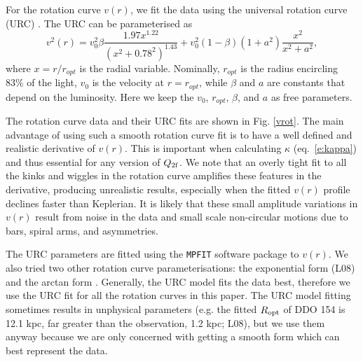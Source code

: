 \documentclass[12pt,preprint]{aastex}
\begin{document}
For the rotation curve $v(r)$, we fit the data using the universal rotation curve (URC) \citep{bat00,per96}. The URC can be parameterised as 
\begin{equation}
v^2(r)=v_0^2\beta \frac{1.97x^{1.22}}{(x^2+0.78^2)^{1.43}}+v_0^2(1-\beta)(1+a^2)\frac{x^2}{x^2+a^2},
\end{equation}
where $x=r/r_{opt}$ is the radial variable. Nominally, $r_{opt}$ is the radius encircling $83\%$ of the light, $v_0$ is the velocity at $r=r_{opt}$, while $\beta$ and $a$ are constants that depend on the luminosity. Here we keep the $v_0$, $r_{opt}$,  $\beta$, and $a$ as free parameters.

The rotation curve data and their URC fits are shown in Fig. \ref{vrot}. The main advantage of using such a smooth rotation curve fit is to have a well defined and realistic derivative of $v(r)$. This is important when calculating $\kappa$ (eq.~\ref{e:kappa}) and thus essential for any version of $Q_{\rm 2f}$.  We note that an overly tight fit to all the kinks and wiggles in the rotation curve amplifies these features in the derivative, producing unrealistic results, especially when the fitted $v(r)$ profile declines faster than Keplerian.  It is likely that these small amplitude variations in $v(r)$ result from noise in the data and small scale non-circular motions due to bars, spiral arms, and asymmetries.


The URC parameters are fitted using  the {\tt MPFIT} software
package \citep{mar09} to $v(r)$.
We also tried two other rotation curve parameterisations: the exponential form (L08) and  the arctan form \citep{cou97}.  Generally, the URC model fits the data best, 
therefore we use the URC fit for all the rotation curves in this paper. 
The URC model fitting sometimes results in unphysical
parameters (e.g. the fitted $R_{\rm opt}$ of DDO 154 is 12.1 kpc,  far greater than the observation, 1.2 kpc; L08), but we use them anyway
because we are only concerned with getting a smooth form which can best
represent the data. %
\end{document}
